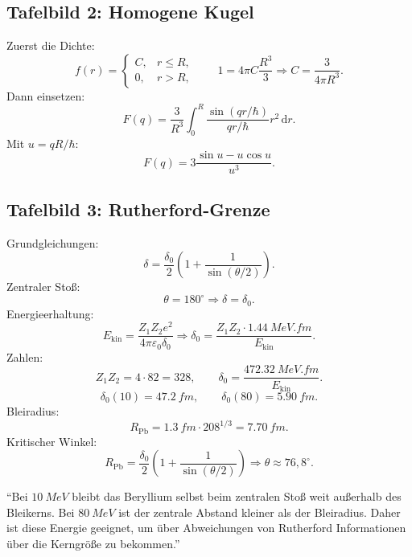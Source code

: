 \documentclass[11pt,a4paper]{scrartcl}
\newcommand{\paren}[1]{\left( #1 \right)}
\newcommand{\dd}{\,\mathrm{d}}
\begin{document}
\subsection{Tafelbild 2: Homogene Kugel}

\begin{calculationbox}[title=Tafelbild]
Zuerst die Dichte:
\[
    f(r)=\begin{cases}
        C, & r\le R,\\
        0, & r>R,
    \end{cases}
    \qquad
    1=4\pi C\frac{R^3}{3}
    \Rightarrow
    C=\frac{3}{4\pi R^3}.
\]
Dann einsetzen:
\[
    F(q)=\frac{3}{R^3}\int_0^R\frac{\sin(qr/\hbar)}{qr/\hbar}r^2\dd r.
\]
Mit $u=qR/\hbar$:
\[
    F(q)=3\frac{\sin u-u\cos u}{u^3}.
\]
\end{calculationbox}

\subsection{Tafelbild 3: Rutherford-Grenze}

\begin{calculationbox}[title=Tafelbild]
Grundgleichungen:
\[
    \delta=\frac{\delta_0}{2}\paren{1+\frac{1}{\sin(\theta/2)}}.
\]
Zentraler Sto\ss{}:
\[
    \theta=180^\circ\Rightarrow \delta=\delta_0.
\]
Energieerhaltung:
\[
    E_{\mathrm{kin}}=\frac{Z_1Z_2e^2}{4\pi\varepsilon_0\delta_0}
    \Rightarrow
    \delta_0=\frac{Z_1Z_2\cdot\SI{1.44}{MeV.fm}}{E_{\mathrm{kin}}}.
\]
Zahlen:
\[
    Z_1Z_2=4\cdot82=328,
    \qquad
    \delta_0=\frac{\SI{472.32}{MeV.fm}}{E_{\mathrm{kin}}}.
\]
\[
    \delta_0(10)=\SI{47.2}{fm},
    \qquad
    \delta_0(80)=\SI{5.90}{fm}.
\]
Bleiradius:
\[
    R_{\mathrm{Pb}}=\SI{1.3}{fm}\cdot 208^{1/3}=\SI{7.70}{fm}.
\]
Kritischer Winkel:
\[
    R_{\mathrm{Pb}}=\frac{\delta_0}{2}\paren{1+\frac{1}{\sin(\theta/2)}}
    \Rightarrow
    \theta\approx 76{,}8^\circ.
\]
\end{calculationbox}

\begin{notebox}[title=Sprechtext dazu]
\enquote{Bei $\SI{10}{MeV}$ bleibt das Beryllium selbst beim zentralen Sto\ss{} weit au\ss{}erhalb des Bleikerns. Bei $\SI{80}{MeV}$ ist der zentrale Abstand kleiner als der Bleiradius. Daher ist diese Energie geeignet, um \"uber Abweichungen von Rutherford Informationen \"uber die Kerngr\"o\ss{}e zu bekommen.}
\end{notebox}

\newpage
\end{document}
